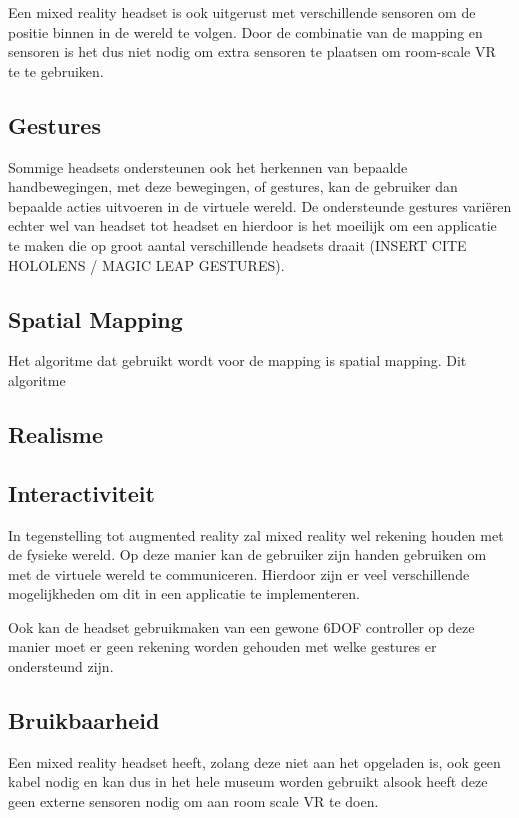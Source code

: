 Een mixed reality headset is ook uitgerust met verschillende sensoren om de positie binnen in de wereld te volgen. Door de combinatie van de mapping en sensoren is het dus niet nodig om extra sensoren te plaatsen om room-scale VR te te gebruiken.

\subsection{Gestures}
Sommige headsets ondersteunen ook het herkennen van bepaalde handbewegingen, met deze bewegingen, of gestures, kan de gebruiker dan bepaalde acties uitvoeren in de virtuele wereld. De ondersteunde gestures variëren echter wel van headset tot headset en hierdoor is het moeilijk om een applicatie te maken die op groot aantal verschillende headsets draait (INSERT CITE HOLOLENS / MAGIC LEAP GESTURES).


\subsection{Spatial Mapping}
Het algoritme dat gebruikt wordt voor de mapping is spatial mapping. Dit algoritme %

\subsection{Realisme}


\subsection{Interactiviteit}
In tegenstelling tot augmented reality zal mixed reality wel rekening houden met de fysieke wereld. Op deze manier kan de gebruiker zijn handen gebruiken om met de virtuele wereld te communiceren. Hierdoor zijn er veel verschillende mogelijkheden om dit in een applicatie te implementeren.

Ook kan de headset gebruikmaken van een gewone 6DOF controller op deze manier moet er geen rekening worden gehouden met welke gestures er ondersteund zijn.

\subsection{Bruikbaarheid}
Een mixed reality headset heeft, zolang deze niet aan het opgeladen is, ook geen kabel nodig en kan dus in het hele museum worden gebruikt alsook heeft deze geen externe sensoren nodig om aan room scale VR te doen. 

